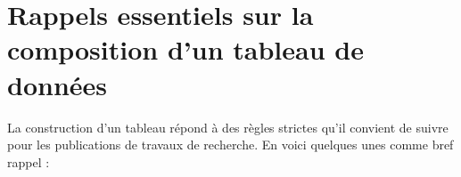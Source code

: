 




\section{Rappels essentiels sur la composition d'un tableau de données}
\label{regles-table}
\vfill

La construction d'un tableau répond à des règles strictes qu'il convient de
suivre pour les publications de travaux de recherche. En voici quelques unes
comme bref rappel :

